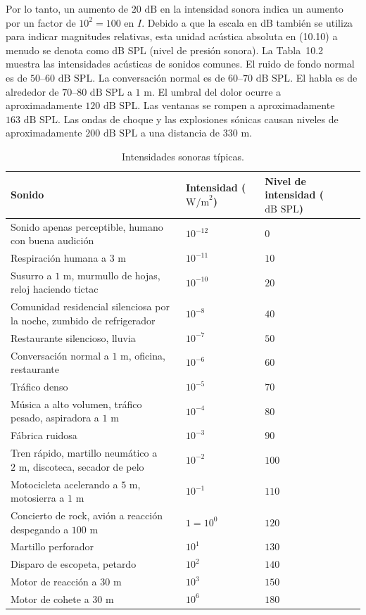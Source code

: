 \documentclass[12pt]{book}
\begin{document}
Por lo tanto, un aumento de $20\text{ dB}$ en la intensidad sonora indica un aumento por un factor de $10^2 = 100$ en $I$. Debido a que la escala en dB también se utiliza para indicar magnitudes relativas, esta unidad acústica absoluta en (10.10) a menudo se denota como dB SPL (nivel de presión sonora). La Tabla~10.2 muestra las intensidades acústicas de sonidos comunes. El ruido de fondo normal es de $50\text{--}60\text{ dB SPL}$. La conversación normal es de $60\text{--}70\text{ dB SPL}$. El habla es de alrededor de $70\text{--}80\text{ dB SPL}$ a $1\text{ m}$. El umbral del dolor ocurre a aproximadamente $120\text{ dB SPL}$. Las ventanas se rompen a aproximadamente $163\text{ dB SPL}$. Las ondas de choque y las explosiones sónicas causan niveles de aproximadamente $200\text{ dB SPL}$ a una distancia de $330\text{ m}$.

\begin{table}[h]
\centering
\caption{Intensidades sonoras típicas.}
\label{tab:102}
\small
\begin{tabularx}{\textwidth}{>{\hsize=1.4\hsize}X >{\centering\arraybackslash\hsize=0.8\hsize}X >{\centering\arraybackslash\hsize=0.8\hsize}X}
\toprule
Sonido & Intensidad ($\text{W/m}^2$) & Nivel de intensidad ($\text{dB SPL}$) \\
\midrule
Sonido apenas perceptible, humano con buena audición & $10^{-12}$ & $0$ \\
Respiración humana a $3\text{ m}$ & $10^{-11}$ & $10$ \\
Susurro a $1\text{ m}$, murmullo de hojas, reloj haciendo tictac & $10^{-10}$ & $20$ \\
Comunidad residencial silenciosa por la noche, zumbido de refrigerador & $10^{-8}$ & $40$ \\
Restaurante silencioso, lluvia & $10^{-7}$ & $50$ \\
Conversación normal a $1\text{ m}$, oficina, restaurante & $10^{-6}$ & $60$ \\
Tráfico denso & $10^{-5}$ & $70$ \\
Música a alto volumen, tráfico pesado, aspiradora a $1\text{ m}$ & $10^{-4}$ & $80$ \\
Fábrica ruidosa & $10^{-3}$ & $90$ \\
Tren rápido, martillo neumático a $2\text{ m}$, discoteca, secador de pelo & $10^{-2}$ & $100$ \\
Motocicleta acelerando a $5\text{ m}$, motosierra a $1\text{ m}$ & $10^{-1}$ & $110$ \\
Concierto de rock, avión a reacción despegando a $100\text{ m}$ & $1 = 10^0$ & $120$ \\
Martillo perforador & $10^1$ & $130$ \\
Disparo de escopeta, petardo & $10^2$ & $140$ \\
Motor de reacción a $30\text{ m}$ & $10^3$ & $150$ \\
Motor de cohete a $30\text{ m}$ & $10^6$ & $180$ \\
\bottomrule
\end{tabularx}
\end{table}
\FloatBarrier
\end{document}
